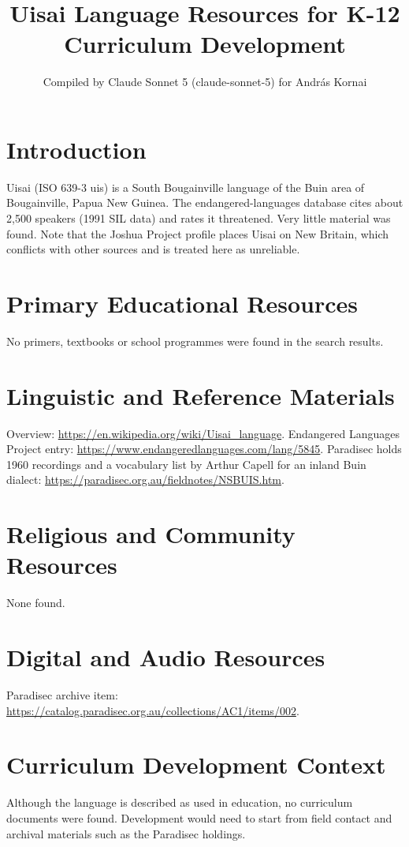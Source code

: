 \documentclass[12pt]{article}
\title{Uisai Language Resources for K-12 Curriculum Development}
\author{Compiled by Claude Sonnet 5 (claude-sonnet-5) for Andr\'as Kornai}
\date{}
\begin{document}
\maketitle

\section{Introduction}
Uisai (ISO 639-3 uis) is a South Bougainville language of the Buin area of Bougainville, Papua New Guinea. The endangered-languages database cites about 2,500 speakers (1991 SIL data) and rates it threatened. Very little material was found. Note that the Joshua Project profile places Uisai on New Britain, which conflicts with other sources and is treated here as unreliable.

\section{Primary Educational Resources}
No primers, textbooks or school programmes were found in the search results.

\section{Linguistic and Reference Materials}
Overview: \url{https://en.wikipedia.org/wiki/Uisai_language}. Endangered Languages Project entry: \url{https://www.endangeredlanguages.com/lang/5845}. Paradisec holds 1960 recordings and a vocabulary list by Arthur Capell for an inland Buin dialect: \url{https://paradisec.org.au/fieldnotes/NSBUIS.htm}.

\section{Religious and Community Resources}
None found.

\section{Digital and Audio Resources}
Paradisec archive item: \url{https://catalog.paradisec.org.au/collections/AC1/items/002}.

\section{Curriculum Development Context}
Although the language is described as used in education, no curriculum documents were found. Development would need to start from field contact and archival materials such as the Paradisec holdings.
\end{document}
